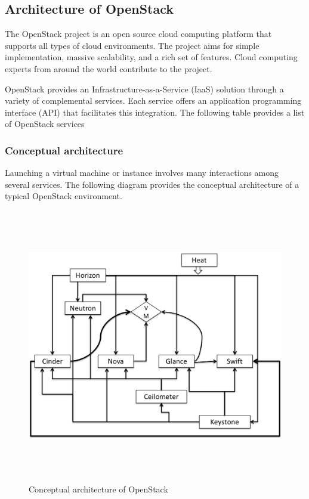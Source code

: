  \subsection{Architecture of OpenStack}
     The OpenStack project is an open source cloud computing platform that supports all types of cloud environments. The project aims for simple implementation, massive scalability, and a rich set of features. Cloud computing experts from around the world contribute to the project.
     \par
     OpenStack provides an Infrastructure-as-a-Service (IaaS) solution through a variety of complemental services. Each service offers an application programming interface (API) that facilitates this integration. The following table provides a list of OpenStack services
     \clearpage
     \subsubsection{Conceptual architecture}
         \par
         Launching a virtual machine or instance involves many interactions among several services. The following diagram provides the conceptual architecture of a typical OpenStack environment.
        \begin{figure}[h]
            \centering
            \includegraphics[height=12cm,width=14cm]{images/arch.png}
            \caption{Conceptual architecture of OpenStack}
        \end{figure}
     
